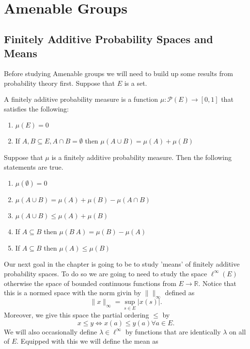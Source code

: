 \section{Amenable Groups}%
\label{sec:Amenable Groups}

\subsection{Finitely Additive Probability Spaces and Means}

Before studying Amenable groups we will need to build up some results from
probability theory first. Suppose that $E$ is a set.
\begin{defn}
  A finitely additive probability measure is a function $\mu: \mathcal{P}(E)
  \to [0, 1]$ that satisfies the following:
  \begin{enumerate}
    \item $\mu(E) = 0$ 
    \item If $A, B \subseteq E, A \cap B = \emptyset$ then $\mu(A \cup B)
      = \mu(A) + \mu(B)$
  \end{enumerate}
\end{defn}

\begin{propn}
  Suppose that $\mu$ is a finitely additive probability measure. Then the
  following statements are true.
  \begin{enumerate}
    \item $\mu(\emptyset) = 0$
    \item $\mu(A \cup B) = \mu(A) + \mu(B) - \mu(A \cap B)$
    \item $\mu(A \cup B) \le \mu(A) + \mu(B)$
    \item If $A \subseteq B$ then $\mu(B \ A) = \mu(B) - \mu(A)$
    \item If $A \subseteq B$ then $\mu(A) \le \mu(B)$
  \end{enumerate}
\end{propn}

Our next goal in the chapter is going to be to study 'means' of finitely
additive probability spaces.  To do so we are going to need to study the space
$\ell^{\infty}(E)$ otherwise the space of bounded continuous functions from $E
\to \mathbb{R}$. Notice that this is a normed space with the norm givin by
$\|\|_{\infty}$ defined as
\[
\|x\|_{\infty} = \sup_{s \in E}|x(s)|
.\] 
Moreover, we give this space the partial ordering $\le$ by
\[
x \le y \iff x(a) \le y(a) \forall a \in E
.\] 
We will also occasionally define $\lambda \in \ell^{\infty}$ by functions that
are identically $\lambda$ on all of $E$. Equipped with this we will define the
mean as

